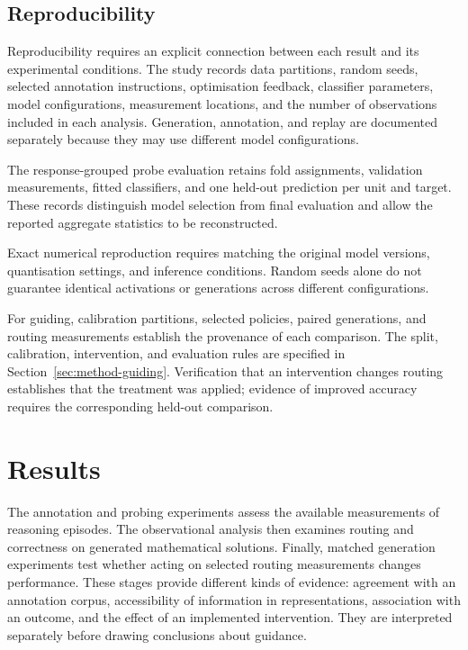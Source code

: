 \documentclass[12pt,a4paper,twoside,openright]{book}
\begin{document}
\section{Reproducibility}
\label{sec:setup-reproducibility}

Reproducibility requires an explicit connection between each result and its
experimental conditions. The study records data partitions, random seeds,
selected annotation instructions, optimisation feedback, classifier
parameters, model configurations, measurement locations, and the number of
observations included in each analysis. Generation, annotation, and replay
are documented separately because they may use different model configurations.

The response-grouped probe evaluation retains fold assignments, validation
measurements, fitted classifiers, and one held-out prediction per unit and
target. These records distinguish model selection from final evaluation and
allow the reported aggregate statistics to be reconstructed.

Exact numerical reproduction requires matching the original model versions,
quantisation settings, and inference conditions. Random seeds alone do not guarantee
identical activations or generations across different configurations.

For guiding, calibration partitions, selected policies, paired generations,
and routing measurements establish the provenance of each comparison. The
split, calibration, intervention, and evaluation rules are specified in
Section~\ref{sec:method-guiding}. Verification that an intervention changes
routing establishes that the treatment was applied; evidence of improved
accuracy requires the corresponding held-out comparison.

\chapter{Results}
\label{ch:results}

The annotation and probing experiments assess the available measurements of
reasoning episodes. The observational analysis then examines routing and
correctness on generated mathematical solutions. Finally, matched generation
experiments test whether acting on selected routing measurements changes
performance. These stages provide different kinds of evidence: agreement
with an annotation corpus, accessibility of information in representations,
association with an outcome, and the effect of an implemented intervention.
They are interpreted separately before drawing conclusions about guidance.
\end{document}
